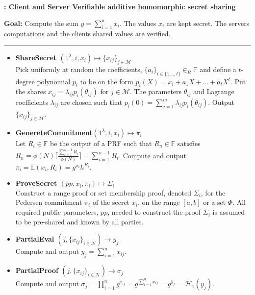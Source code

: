 \begin{algorithm}
\caption{\textbf{: Client and Server Verifiable additive homomorphic secret sharing}}

\textbf{Goal:} Compute the sum $y = \sum_{i=1}^n x_i$. The values $x_i$ are kept secret. The servers computations and the clients shared values are verified. 
\vspace{2pt}\hrule\vspace{2pt}
\begin{itemize}
 \item\textbf{ShareSecret $(1^\lambda,i,x_i) \mapsto \{x_{ij}\}_{j\in\mathcal{M}}$} \\
Pick uniformly at random the coefficients, $\{a_i\}_{i\in\{1,..,t\}}\in_R\mathds{F}$ and define a $t$-degree polynomial $p_i$ to be on the form $p_i(X) = x_i + a_1X+...+a_tX^t$. Put the shares $x_{ij}=\lambda_{ij}p_i(\theta_{ij})$ for $j\in\mathcal{M}$.  The parameters $\theta_{ij}$ and Lagrange coefficients $\lambda_{ij}$ are chosen such that $ p_i(0) = \sum_{j=1}^m \lambda_{ij}p_i(\theta_{ij})$.
Output $\{x_{ij}\}_{j\in\mathcal{M}}$.

\item\textbf{GenereteCommitment$(1^\lambda,i,x_i) \mapsto \pi_i$ }\\
Let $R_i\in\mathds{F}$ be the output of a PRF such that $R_n\in \mathds{F}$  satisfies $R_n = \phi(N)\lceil \frac{\sum_{i=1}^{n-1}R_i}{\phi(N)}\rceil- \sum_{i=1}^{n-1}R_i $. Compute and output $\pi_i = \mathds{E}(x_i,R_i)= g^{x_i}h^{R_i}$.

\item\textbf{ProveSecret $(pp,x_i,\pi_i) \mapsto \Sigma_i$}\\
Construct a range proof or set membership proof, denoted $\Sigma_i$, for the Pedersen commitment $\pi_i$ of the secret $x_i$, on the  range $[a,b]$ or a set $\Phi$. All required public parameters, $pp$, needed to  construct the proof $\Sigma_i$ is assumed to be pre-shared and known by all parties.
\item\textbf{PartialEval $(j,\{x_{ij}\}_{i\in\mathcal{N}})\xrightarrow[]{}y_j$}\\
Compute and output $y_j = \sum_{i=1}^n x_{ij}$.

\item\textbf{PartialProof $(j,\{x_{ij}\}_{i\in\mathcal{N}})\xrightarrow[]{}\sigma_j$}\\
Compute and output $\sigma_j = \prod_{i=1}^n g^{x_{ij}} =  g^{\sum_{i=1}^n x_{ij}}= g^{y_j}=\mathcal{H}_1(y_j)$.


\end{itemize}
\end{algorithm}
